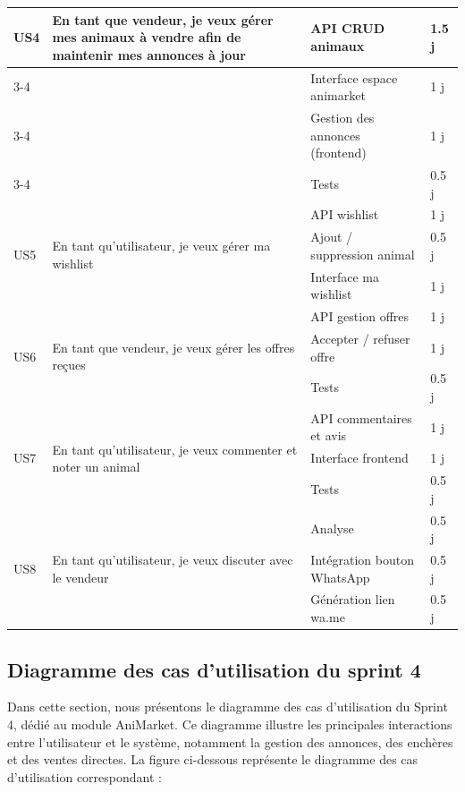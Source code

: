 \begin{longtable}{|p{1cm}|p{5cm}|p{8cm}|p{1cm}|}
\multirow{4}{2cm}{US4}
& \multirow{4}{5cm}{En tant que vendeur, je veux gérer mes animaux à vendre afin de maintenir mes annonces à jour}
& API CRUD animaux & 1.5 j \\
\cline{3-4}
& & Interface espace animarket & 1 j \\
\cline{3-4}
& & Gestion des annonces (frontend) & 1 j \\
\cline{3-4}
& & Tests & 0.5 j \\
\hline

\multirow{3}{2cm}{US5}
& \multirow{3}{5cm}{En tant qu’utilisateur, je veux gérer ma wishlist}
& API wishlist & 1 j \\
\cline{3-4}
& & Ajout / suppression animal & 0.5 j \\
\cline{3-4}
& & Interface ma wishlist & 1 j \\
\hline

\multirow{3}{2cm}{US6}
& \multirow{3}{5cm}{En tant que vendeur, je veux gérer les offres reçues}
& API gestion offres & 1 j \\
\cline{3-4}
& & Accepter / refuser offre & 1 j \\
\cline{3-4}
& & Tests & 0.5 j \\
\hline

\multirow{3}{2cm}{US7}
& \multirow{3}{5cm}{En tant qu’utilisateur, je veux commenter et noter un animal}
& API commentaires et avis & 1 j \\
\cline{3-4}
& & Interface frontend & 1 j \\
\cline{3-4}
& & Tests & 0.5 j \\
\hline

\multirow{3}{2cm}{US8}
& \multirow{3}{5cm}{En tant qu’utilisateur, je veux discuter avec le vendeur}
& Analyse & 0.5 j \\
\cline{3-4}
& & Intégration bouton WhatsApp & 0.5 j \\
\cline{3-4}
& & Génération lien wa.me & 0.5 j \\
\hline

\end{longtable}
\newpage
\subsection{Diagramme des cas d’utilisation du sprint 4} 
Dans cette section, nous présentons le diagramme des cas d’utilisation du Sprint 4, dédié au module AniMarket.  
Ce diagramme illustre les principales interactions entre l’utilisateur et le système, notamment la gestion des annonces, des enchères et des ventes directes.  
La figure ci-dessous représente le diagramme des cas d’utilisation correspondant : 


